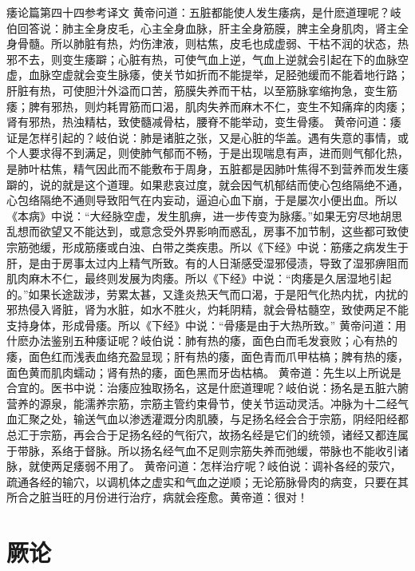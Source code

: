 \documentclass[12pt,UTF8]{ctexbook}
\begin{document}
痿论篇第四十四参考译文
黄帝问道：五脏都能使人发生痿病，是什麽道理呢？岐伯回答说：肺主全身皮毛，心主全身血脉，肝主全身筋膜，脾主全身肌肉，肾主全身骨髓。所以肺脏有热，灼伤津液，则枯焦，皮毛也成虚弱、干枯不润的状态，热邪不去，则变生痿躃；心脏有热，可使气血上逆，气血上逆就会引起在下的血脉空虚，血脉空虚就会变生脉痿，使关节如折而不能提举，足胫弛缓而不能着地行路；肝脏有热，可使胆汁外溢而口苦，筋膜失养而干枯，以至筋脉挛缩拘急，变生筋痿；脾有邪热，则灼耗胃筋而口渴，肌肉失养而麻木不仁，变生不知痛痒的肉痿；肾有邪热，热浊精枯，致使髓减骨枯，腰脊不能举动，变生骨痿。
黄帝问道：痿证是怎样引起的？岐伯说：肺是诸脏之张，又是心脏的华盖。遇有失意的事情，或个人要求得不到满足，则使肺气郁而不畅，于是出现喘息有声，进而则气郁化热，是肺叶枯焦，精气因此而不能敷布于周身，五脏都是因肺叶焦得不到营养而发生痿躃的，说的就是这个道理。如果悲哀过度，就会因气机郁结而使心包络隔绝不通，心包络隔绝不通则导致阳气在内妄动，逼迫心血下崩，于是屡次小便出血。所以《本病》中说：“大经脉空虚，发生肌痹，进一步传变为脉痿。”如果无穷尽地胡思乱想而欲望又不能达到，或意念受外界影响而惑乱，房事不加节制，这些都可致使宗筋弛缓，形成筋痿或白浊、白带之类疾患。所以《下经》中说：筋痿之病发生于肝，是由于房事太过内上精气所致。有的人日渐感受湿邪侵渍，导致了湿邪痹阻而肌肉麻木不仁，最终则发展为肉痿。所以《下经》中说：“肉痿是久居湿地引起的。”如果长途跋涉，劳累太甚，又逢炎热天气而口渴，于是阳气化热内扰，内扰的邪热侵入肾脏，肾为水脏，如水不胜火，灼耗阴精，就会骨枯髓空，致使两足不能支持身体，形成骨痿。所以《下经》中说：“骨痿是由于大热所致。”
黄帝问道：用什麽办法鉴别五种痿证呢？岐伯说：肺有热的痿，面色白而毛发衰败；心有热的痿，面色红而浅表血络充盈显现；肝有热的痿，面色青而爪甲枯槁；脾有热的痿，面色黄而肌肉蠕动；肾有热的痿，面色黑而牙齿枯槁。
黄帝道：先生以上所说是合宜的。医书中说：治痿应独取扬名，这是什麽道理呢？岐伯说：扬名是五脏六腑营养的源泉，能濡养宗筋，宗筋主管约束骨节，使关节运动灵活。冲脉为十二经气血汇聚之处，输送气血以渗透灌溉分肉肌腠，与足扬名经会合于宗筋，阴经阳经都总汇于宗筋，再会合于足扬名经的气衔穴，故扬名经是它们的统领，诸经又都连属于带脉，系络于督脉。所以扬名经气血不足则宗筋失养而弛缓，带脉也不能收引诸脉，就使两足痿弱不用了。
黄帝问道：怎样治疗呢？岐伯说：调补各经的荥穴，疏通各经的输穴，以调机体之虚实和气血之逆顺；无论筋脉骨肉的病变，只要在其所合之脏当旺的月份进行治疗，病就会痊愈。黄帝道：很对！

\chapter{厥论}
\end{document}
